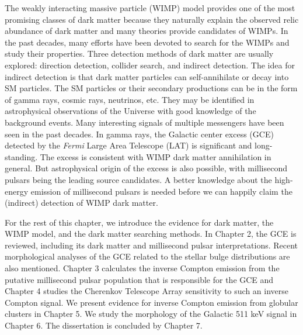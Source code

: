 \documentclass[doublespace,nopageskip]{VTthesis} %
\begin{document}
The weakly interacting massive particle (WIMP) model provides one of the most promising classes of dark matter because they naturally explain the observed relic abundance of dark matter and many theories provide candidates of WIMPs. In the past decades, many efforts have been devoted to search for the WIMPs and study their properties. Three detection methods of dark matter are usually explored: direction detection, collider search, and indirect detection. The idea for indirect detection is that dark matter particles can self-annihilate or decay into SM particles. The SM particles or their secondary productions can be in the form of gamma rays, cosmic rays, neutrinos, etc. They may be identified in astrophysical observations of the Universe with good knowledge of the background events. Many interesting signals of multiple messengers have been seen in the past decades. In gamma rays, the Galactic center excess (GCE) detected by the \textit{Fermi} Large Area Telescope (LAT) is significant and long-standing. The excess is consistent with WIMP dark matter annihilation in general. But astrophysical origin of the excess is also possible, with millisecond pulsars being the leading source candidates. A better knowledge about the high-energy emission of millisecond pulsars is needed before we can happily claim the (indirect) detection of WIMP dark matter.

For the rest of this chapter, we introduce the evidence for dark matter, the WIMP model, and the dark matter searching methods. In Chapter 2, the GCE is reviewed, including its dark matter and millisecond pulsar interpretations. Recent morphological analyses of the GCE related to the stellar bulge distributions are also mentioned. Chapter 3 calculates the inverse Compton emission from the putative millisecond pulsar population that is responsible for the GCE and Chapter 4 studies the Cherenkov Telescope Array sensitivity to such an inverse Compton signal. We present evidence for inverse Compton emission from globular clusters in Chapter 5. We study the morphology of the Galactic 511 keV signal in Chapter 6. The dissertation is concluded by Chapter 7.

\end{document}
